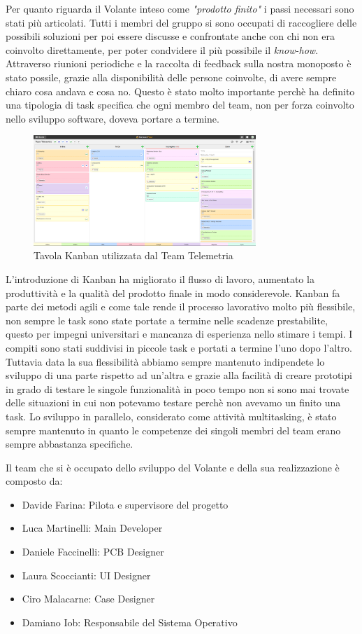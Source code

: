 Per quanto riguarda il Volante inteso come \emph{"prodotto finito"} i passi necessari sono stati più articolati.
Tutti i membri del gruppo si sono occupati di raccogliere delle possibili soluzioni per poi essere discusse e
confrontate anche con chi non era coinvolto direttamente, per poter condvidere il più possibile il \emph{know-how}.
Attraverso riunioni periodiche e la raccolta di feedback sulla nostra monoposto è stato possile, grazie alla disponibilità
delle persone coinvolte, di avere sempre chiaro cosa andava e cosa no. 
Questo è stato molto importante perchè ha definito una tipologia di task specifica che ogni membro del team, non per forza 
coinvolto nello sviluppo software, doveva portare a termine.

\begin{figure}[!hbt]
  \centering
  \includegraphics[width=0.75\textwidth]{./figures/kanban.png}
  \caption{Tavola Kanban utilizzata dal Team Telemetria}
\end{figure}

L'introduzione di Kanban ha migliorato il flusso di lavoro, aumentato la produttività e la qualità del prodotto finale in modo considerevole. 
Kanban fa parte dei metodi agili e come tale rende il processo lavorativo molto più flessibile, 
non sempre le task sono state portate a termine nelle scadenze prestabilite, 
questo per impegni universitari e mancanza di esperienza nello stimare i tempi. 
I compiti sono stati suddivisi in piccole task e portati a termine l’uno dopo l’altro. 
Tuttavia data la sua flessibilità abbiamo sempre mantenuto indipendete lo sviluppo di una parte rispetto ad un'altra e grazie alla facilità 
di creare prototipi in grado di testare le singole funzionalità in poco tempo non si sono mai trovate delle situazioni in cui non potevamo testare 
perchè non avevamo un finito una task. 
Lo sviluppo in parallelo, considerato come attività multitasking, è stato sempre mantenuto in quanto le competenze dei singoli membri del team erano sempre 
abbastanza specifiche. 

Il team che si è occupato dello sviluppo del Volante e della sua realizzazione è composto da:
\begin{itemize}
  \item Davide Farina: Pilota e supervisore del progetto
  \item Luca Martinelli: Main Developer
  \item Daniele Faccinelli: PCB Designer 
  \item Laura Scoccianti: UI Designer
  \item Ciro Malacarne: Case Designer
  \item Damiano Iob: Responsabile del Sistema Operativo
\end{itemize}

